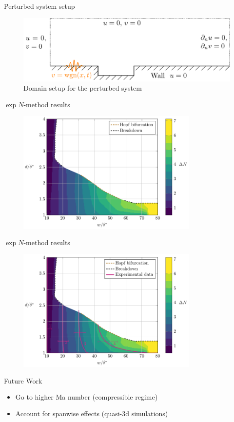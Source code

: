 \documentclass[aspectratio=43, xcolor=table]{beamer}
\begin{document}
\begin{frame}{Perturbed system setup}

	\begin{figure}[ht]
		\centering
		\includegraphics[width=\textwidth]{../../Images/domainPert.pdf}
		\caption{Domain setup for the perturbed system}
	\end{figure}

\end{frame}
\begin{frame}{$\exp{N}$-method results}
	\begin{figure}
		\centering
		\includegraphics[width=0.8\textwidth]{Images/nfactor_countour_plain.pdf}
	\end{figure}
	\vspace{0.42cm}
\end{frame}
\begin{frame}{$\exp{N}$-method results}
	\begin{figure}
		\centering
		\includegraphics[width=0.8\textwidth]{Images/nfactor_countour.pdf}
	\end{figure}
\end{frame}
\begin{frame}{Future Work}
	\begin{itemize}
		\item Go to higher Ma number (compressible regime)\pause
		\item Account for spanwise effects (quasi-3d simulations)
	\end{itemize}
\end{frame}
\end{document}
